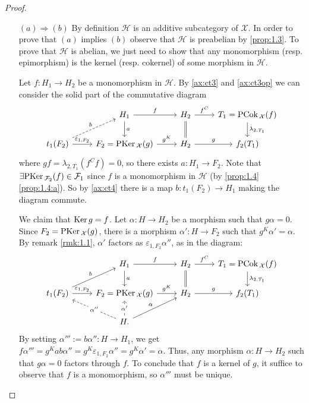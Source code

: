 \begin{proof} ~


  \begin{enumerate}
    \item[$(a)\Rightarrow (b)$]
      By definition $\mathcal{H}$ is an additive subcategory of $\mathcal{X}$. In order to prove
      that $(a)$ implies $(b)$  observe that
      $\mathcal{H}$ is preabelian by \cref{prop:1.3}. To prove that $\mathcal{H}$ is abelian, we
      just need to show that any monomorphism (resp. epimorphism) is the kernel (resp. cokernel) of some
      morphism in $\mathcal{H}$.

      Let $f:H_1\to H_2$ be a monomorphism in $\mathcal{H}$. By \ref{ax:ct3} and \ref{ax:ct3op} we can
      consider the solid part of the commutative diagram
      \begin{equation*}
        \begin{tikzcd}
          & H_1\arrow{r}{f}\arrow{d}{a}
            & H_2\arrow{r}{f^C}\arrow[equal]{d}
              & T_1 = \PCok_\mathcal{X}(f)\arrow{d}{\lambda_{2,T_1}}\\
          t_1(F_2)\arrow[dashed]{ur}{b}\arrow{r}{\varepsilon_{1,F_2}}
          & F_2=\PKer_\mathcal{X}(g)\arrow{r}{g^K}
            & H_2\arrow{r}{g}
              & f_2(T_1)
        \end{tikzcd}
      \end{equation*}
      where $gf = \lambda_{2,T_1}(f^C f)=0$, so there exists $a:H_1\to F_2$. Note that $\exists \mathrm{\textup{PKer\,}}_{\mathcal{F}_2}(f)\in\mathcal{F}_1$
      since $f$ is a monomorphism in $\mathcal{H}$ (by \cref{prop:1.4}\ref{prop:1.4:a}). So
      by \ref{ax:ct4}  there is a map $b:t_1(F_2)\to H_1$ making the diagram commute.

      We claim that $\mathrm{\textup{Ker\,}} g = f$. Let $\alpha:H\to H_2$ be a morphism such that $g\alpha =0$. Since
      $F_2 = \mathrm{\textup{PKer\,}}_\mathcal{X}(g)$, there is a morphism $\alpha':H\to F_2$ such that $g^K\alpha'=\alpha$.
      By remark \ref{rmk:1.1}, $\alpha'$ factors as $\varepsilon_{1,F_2}\alpha''$, as in the diagram:
      \begin{equation*}
        \begin{tikzcd}
          & H_1\arrow{r}{f}\arrow{d}{a}
            & H_2\arrow{r}{f^C}\arrow[equal]{d}
              & T_1 = \PCok_\mathcal{X}(f)\arrow{d}{\lambda_{2,T_1}}\\
          t_1(F_2)\arrow{ur}{b}\arrow{r}{\varepsilon_{1,F_2}}
          & F_2=\PKer_\mathcal{X}(g)\arrow{r}{g^K}
            & H_2\arrow{r}{g}
              & f_2(T_1)\\
          & H.\arrow{ur}{\alpha}\arrow[dashed]{u}[description]{\alpha'}\arrow[dashed]{ul}[description]{\alpha''}
            & &
        \end{tikzcd}
      \end{equation*}
      By setting $\alpha''' := b\alpha'':H\to H_1$, we get
      $f\alpha''' = g^K ab\alpha'' = g^K\varepsilon_{1,F_2}\alpha''=g^K\alpha' = \alpha$. Thus,
      any morphism $\alpha:H \to H_2$ such that $g\alpha =0$ factors through $f$. To conclude that $f$ is
      a kernel of $g$, it suffice to observe that $f$ is a monomorphism, so $\alpha'''$ must be unique.


\end{enumerate}
\end{proof}
